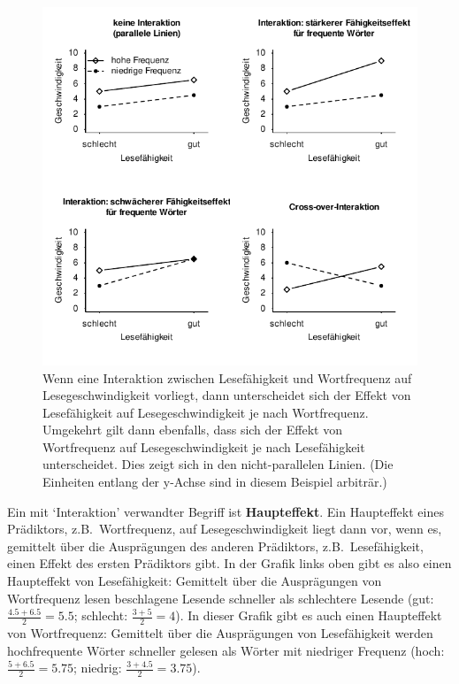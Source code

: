 \documentclass[oneside, 10pt]{book}\usepackage[]{graphicx}\usepackage[]{xcolor}
\newenvironment{knitrout}{}{} %
\begin{document}
\begin{knitrout}
\color{fgcolor}\begin{figure}[tp]

{\centering \includegraphics[width=.8\textwidth]{figs/unnamed-chunk-270-1} 

}

\caption{Wenn eine Interaktion zwischen Lesefähigkeit und Wortfrequenz auf Lesegeschwindigkeit vorliegt, dann unterscheidet sich der Effekt von Lesefähigkeit auf Lesegeschwindigkeit je nach Wortfrequenz. Umgekehrt gilt dann ebenfalls, dass sich der Effekt von Wortfrequenz auf Lesegeschwindigkeit je nach Lesefähigkeit unterscheidet. Dies zeigt sich in den nicht-parallelen Linien. (Die Einheiten entlang der y-Achse sind in diesem Beispiel arbiträr.)\label{fig:interactions}}\label{fig:unnamed-chunk-270}
\end{figure}

\end{knitrout}

Ein mit `Interaktion' verwandter Begriff ist \textbf{Haupteffekt}.
Ein Haupteffekt eines Prädiktors, z.B.\ Wortfrequenz, auf Lesegeschwindigkeit liegt dann vor,
wenn es, gemittelt über die Ausprägungen des anderen Prädiktors, z.B.\ Lesefähigkeit, einen
Effekt des ersten Prädiktors gibt.
In der Grafik links oben gibt es also einen Haupteffekt von Lesefähigkeit:
Gemittelt über die Ausprägungen von Wortfrequenz lesen beschlagene Lesende
schneller als schlechtere Lesende (gut: $\frac{4.5+6.5}{2}=5.5$; schlecht: $\frac{3+5}{2}=4$).
In dieser Grafik gibt es auch einen Haupteffekt von Wortfrequenz:
Gemittelt über die Ausprägungen von Lesefähigkeit
werden hochfrequente Wörter schneller gelesen als Wörter mit niedriger
Frequenz (hoch: $\frac{5+6.5}{2}=5.75$; niedrig: $\frac{3+4.5}{2}=3.75$).
\end{document}
